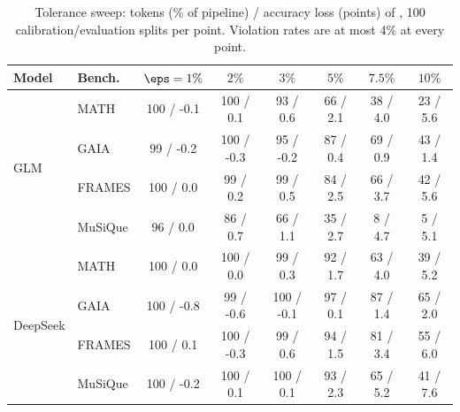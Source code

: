 \begin{table}[h]
\centering
\small
\begin{tabular}{@{}llcccccc@{}}
\toprule
Model & Bench. & $\eps = 1\%$ & $2\%$ & $3\%$ & $5\%$ & $7.5\%$ & $10\%$ \\
\midrule
\multirow{4}{*}{GLM} & MATH & 100 / -0.1 & 100 / 0.1 & 93 / 0.6 & 66 / 2.1 & 38 / 4.0 & 23 / 5.6 \\
 & GAIA & 99 / -0.2 & 100 / -0.3 & 95 / -0.2 & 87 / 0.4 & 69 / 0.9 & 43 / 1.4 \\
 & FRAMES & 100 / 0.0 & 99 / 0.2 & 99 / 0.5 & 84 / 2.5 & 66 / 3.7 & 42 / 5.6 \\
 & MuSiQue & 96 / 0.0 & 86 / 0.7 & 66 / 1.1 & 35 / 2.7 & 8 / 4.7 & 5 / 5.1 \\
\midrule
\multirow{4}{*}{DeepSeek} & MATH & 100 / 0.0 & 100 / 0.0 & 99 / 0.3 & 92 / 1.7 & 63 / 4.0 & 39 / 5.2 \\
 & GAIA & 100 / -0.8 & 99 / -0.6 & 100 / -0.1 & 97 / 0.1 & 87 / 1.4 & 65 / 2.0 \\
 & FRAMES & 100 / 0.1 & 100 / -0.3 & 99 / 0.6 & 94 / 1.5 & 81 / 3.4 & 55 / 6.0 \\
 & MuSiQue & 100 / -0.2 & 100 / 0.1 & 100 / 0.1 & 93 / 2.3 & 65 / 5.2 & 41 / 7.6 \\
\bottomrule
\end{tabular}
\caption{Tolerance sweep: tokens (\% of pipeline) / accuracy loss (points) of \climb{}, 100 calibration/evaluation splits per
point. Violation rates are at most 4\% at every point.}
\label{tab:sweep}
\end{table}
